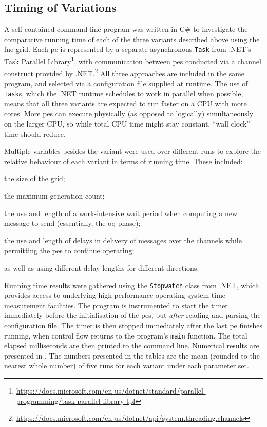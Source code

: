 \subsection{\label{sec:nmp:timingexp}Timing of Variations}
A self-contained command-line program was written in C\# to investigate the comparative running time of each of the three variants described above using the \gls{fne} grid.  Each \gls{pe} is represented by a separate asynchronous \texttt{Task} from .NET's Task Parallel Library{\footnote{\raggedright\url{https://docs.microsoft.com/en-us/dotnet/standard/parallel-programming/task-parallel-library-tpl}}}, with communication between \glspl{pe} conducted via a channel construct provided by .NET.\footnote{\url{https://docs.microsoft.com/en-us/dotnet/api/system.threading.channels}}  All three approaches are included in the same program, and selected via a configuration file supplied at runtime. The use of \texttt{Task}s, which the .NET runtime schedules to work in parallel when possible, means that all three variants are expected to run faster on a CPU with more cores.   More \glspl{pe} can execute physically (as opposed to logically) simultaneously on the larger CPU, so while total CPU time might stay constant, ``wall clock'' time should reduce.

Multiple variables besides the variant were used over different runs to explore the relative behaviour of each variant in terms of running time.  These included:
\begin{inparablank}
\item the size of the grid;
\item the maximum generation count;
\item the use and length of a work-intensive wait period when computing a new message to send (essentially, the \gls{oq} phase);
\item the use and length of delays in delivery of messages over the channels while permitting the \glspl{pe} to continue operating;
\item as well as using different delay lengths for different directions.
\end{inparablank}

Running time results were gathered using the \texttt{Stopwatch} class from .NET, which provides access to underlying high-performance operating system time measurement facilities.  The program is instrumented to start the timer immediately before the initialisation of the \glspl{pe}, but \emph{after} reading and parsing the configuration file.  The timer is then stopped immediately after the last \gls{pe} finishes running, when control flow returns to the program's \texttt{main} function.  The total elapsed milliseconds are then printed to the command line.  Numerical results are presented in .  The numbers presented in the tables are the mean (rounded to the nearest whole number) of five runs for each variant under each parameter set.

